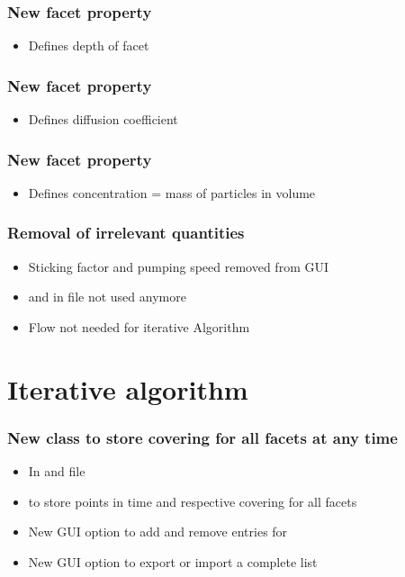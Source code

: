 \subsubsection{New facet property }
\begin{itemize}[noitemsep,topsep=0pt]
\item Defines depth of facet
\end{itemize}


\subsubsection{New facet property }
\begin{itemize}[noitemsep,topsep=0pt]
\item Defines diffusion coefficient
\end{itemize}


\subsubsection{New facet property }
\begin{itemize}[noitemsep,topsep=0pt]
\item Defines concentration = mass of particles in volume
\end{itemize}

\subsubsection{Removal of irrelevant quantities}
\begin{itemize}[noitemsep,topsep=0pt]
\item Sticking factor and pumping speed removed from GUI
\item {} and  in  file not used anymore
\item Flow not needed for iterative Algorithm
\end{itemize}

\section{Iterative algorithm}
\subsubsection{New class to store covering for all facets at any time} 
\begin{itemize}[noitemsep,topsep=0pt]
\item In  and  file
\item {} to store points in time and respective covering for all facets
\item New GUI option to add and remove entries for 
\item New GUI option to export or import a complete list
\end{itemize}

